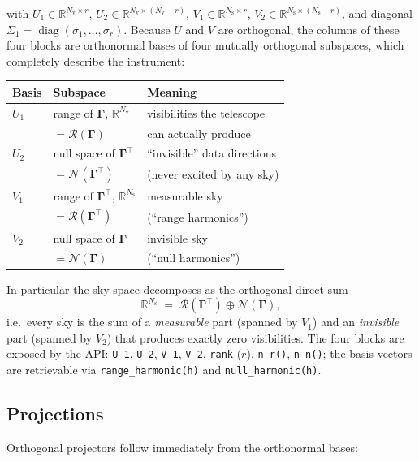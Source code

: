 \documentclass[11pt,a4paper]{article}
\newcommand{\R}{\mathbb{R}}
\newcommand{\Ns}{N_{\mathrm{s}}}
\newcommand{\Nv}{N_{\mathrm{v}}}
\newcommand{\Gammam}{\boldsymbol{\Gamma}}
\begin{document}
with $U_1\in\R^{\Nv\times r}$, $U_2\in\R^{\Nv\times(\Nv-r)}$,
$V_1\in\R^{\Ns\times r}$, $V_2\in\R^{\Ns\times(\Ns-r)}$, and diagonal
$\Sigma_1=\operatorname{diag}(\sigma_1,\dots,\sigma_r)$. Because $U$ and $V$
are orthogonal, the columns of these four blocks are orthonormal bases of four
mutually orthogonal subspaces, which completely describe the instrument:
\cite{nullspace2016}

\begin{center}
\begin{tabular}{lll}
\toprule
Basis & Subspace & Meaning \\
\midrule
$U_1$ & range of $\Gammam$, $\R^{\Nv}$ & visibilities the telescope \\
      & $=\mathcal{R}(\Gammam)$ & can actually produce \\
$U_2$ & null space of $\Gammam^{\!\top}$ & ``invisible'' data directions \\
      & $=\mathcal{N}(\Gammam^{\!\top})$ & (never excited by any sky) \\
$V_1$ & range of $\Gammam^{\!\top}$, $\R^{\Ns}$ & measurable sky \\
      & $=\mathcal{R}(\Gammam^{\!\top})$ & (``range harmonics'') \\
$V_2$ & null space of $\Gammam$ & invisible sky \\
      & $=\mathcal{N}(\Gammam)$ & (``null harmonics'') \\
\bottomrule
\end{tabular}
\end{center}

In particular the sky space decomposes as the orthogonal direct sum
\begin{equation}
  \R^{\Ns} \;=\; \mathcal{R}(\Gammam^{\!\top}) \oplus \mathcal{N}(\Gammam),
\end{equation}
i.e.\ every sky is the sum of a \emph{measurable} part (spanned by $V_1$) and
an \emph{invisible} part (spanned by $V_2$) that produces exactly zero
visibilities. The four blocks are exposed by the API:
\texttt{U\_1}, \texttt{U\_2}, \texttt{V\_1}, \texttt{V\_2},
\texttt{rank} ($r$), \texttt{n\_r()}, \texttt{n\_n()}; the basis vectors are
retrievable via \texttt{range\_harmonic(h)} and \texttt{null\_harmonic(h)}.

\subsection{Projections}

Orthogonal projectors follow immediately from the orthonormal bases:
\end{document}
